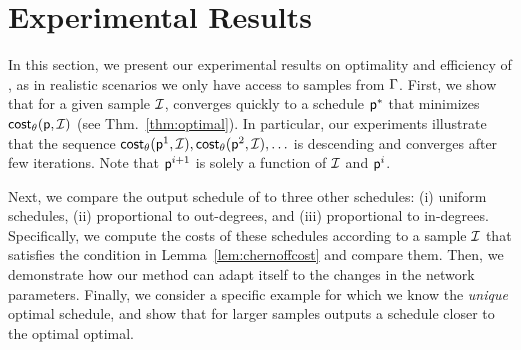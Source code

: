 \section{Experimental Results}\label{sec:exp}
In this section, we present our experimental results on optimality and
efficiency of \algonameapx, as in realistic scenarios we only have access to
samples from $\Gamma$. First, we show that for a given sample $\mathcal{I}$,
\algonameapx 
converges quickly to a schedule $\mathsf{p}^*$ that minimizes $\mathsf{cost}_\theta(\mathsf{p},
\mathcal{I})$ (see Thm.~\ref{thm:optimal}). In particular, our experiments
illustrate that the sequence $\mathsf{cost}_\theta(\mathsf{p}^1,\mathcal{I}), \mathsf{cost}_\theta(\mathsf{p}^2, \mathcal{I}),
\ldots$ is descending and converges after few iterations.  Note that
$\mathsf{p}^{i+1}$ is solely a function of $\mathcal{I}$ and $\mathsf{p}^i$. 

Next, we compare the output schedule of \algonameapx to three other schedules: (i) uniform schedules, (ii) proportional to out-degrees, and (iii) proportional to in-degrees. Specifically, we compute the costs of these schedules according to a sample $\mathcal{I}$ that satisfies the condition in Lemma~\ref{lem:chernoffcost} and compare them.
Then, we demonstrate how our method can adapt itself to the changes in the network parameters. Finally, we consider a specific example for which we know the \emph{unique} optimal schedule, and show that for larger samples \algonameapx outputs a schedule closer to the optimal optimal.




